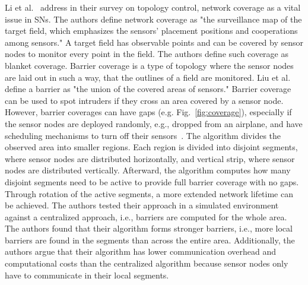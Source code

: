 Li et al.~\cite{li2013survey} address in their survey on topology control,
network coverage as a vital issue in \acp{SN}. The authors define network
coverage as "the surveillance map of the target field, which emphasizes the
sensors' placement positions and cooperations among sensors." A target field
has observable points and can be covered by sensor nodes to monitor every point
in the field. The authors define such coverage as blanket coverage. Barrier
coverage is a type of topology where the sensor nodes are laid out in such a
way, that the outlines of a field are monitored. Liu et
al.~\cite{liu2008strong} define a barrier as "the union of the covered areas of
sensors." Barrier coverage can be used to spot intruders if they cross an area
covered by a sensor node. However, barrier coverages can have gaps (e.g.
Fig.~\ref{fig:coverage}), especially if the sensor nodes are deployed randomly,
e.g., dropped from an airplane, and have scheduling mechanisms to turn off
their sensors~\cite{liu2008strong}. The algorithm divides the observed area
into smaller regions. Each region is divided into disjoint segments, where
sensor nodes are distributed horizontally, and vertical strip, where sensor
nodes are distributed vertically. Afterward, the algorithm computes how many
disjoint segments need to be active to provide full barrier coverage with no
gaps. Through rotation of the active segments, a more extended network lifetime
can be achieved. The authors tested their approach in a simulated environment
against a centralized approach, i.e., barriers are computed for the whole area.
The authors found that their algorithm forms stronger barriers, i.e., more
local barriers are found in the segments than across the entire area.
Additionally, the authors argue that their algorithm has lower communication
overhead and computational costs than the centralized algorithm because sensor
nodes only have to communicate in their local segments.


